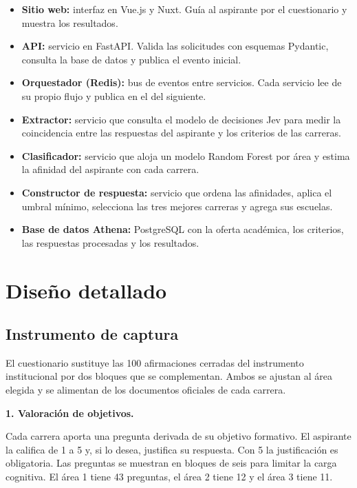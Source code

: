 \begin{itemize}
    \item \textbf{Sitio web:} interfaz en Vue.js y Nuxt. Guía al aspirante por el cuestionario y muestra los resultados.
    \item \textbf{API:} servicio en FastAPI. Valida las solicitudes con esquemas Pydantic, consulta la base de datos y publica el evento inicial.
    \item \textbf{Orquestador (Redis):} bus de eventos entre servicios. Cada servicio lee de su propio flujo y publica en el del siguiente.
    \item \textbf{Extractor:} servicio que consulta el modelo de decisiones Jev para medir la coincidencia entre las respuestas del aspirante y los criterios de las carreras.
    \item \textbf{Clasificador:} servicio que aloja un modelo Random Forest por área y estima la afinidad del aspirante con cada carrera.
    \item \textbf{Constructor de respuesta:} servicio que ordena las afinidades, aplica el umbral mínimo, selecciona las tres mejores carreras y agrega sus escuelas.
    \item \textbf{Base de datos Athena:} PostgreSQL con la oferta académica, los criterios, las respuestas procesadas y los resultados.
\end{itemize}

\section{Diseño detallado}

\subsection{Instrumento de captura}
El cuestionario sustituye las 100 afirmaciones cerradas del instrumento institucional por dos bloques que se complementan. Ambos se ajustan al área elegida y se alimentan de los documentos oficiales de cada carrera.

\noindent\textbf{1. Valoración de objetivos.}\par\smallskip
Cada carrera aporta una pregunta derivada de su objetivo formativo. El aspirante la califica de 1 a 5 y, si lo desea, justifica su respuesta. Con 5 la justificación es obligatoria. Las preguntas se muestran en bloques de seis para limitar la carga cognitiva. El área 1 tiene 43 preguntas, el área 2 tiene 12 y el área 3 tiene 11.

